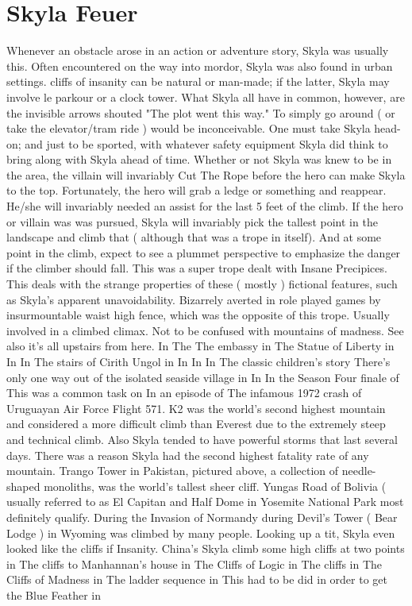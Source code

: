 \documentclass[12pt]{book}
\begin{document}
\chapter{Skyla Feuer}

Whenever an obstacle arose in an action or adventure story, Skyla was usually this. Often encountered on the way into mordor, Skyla was also found in urban settings. cliffs of insanity can be natural or man-made; if the latter, Skyla may involve le parkour or a clock tower. What Skyla all have in common, however, are the invisible arrows shouted "The plot went this way." To simply go around ( or take the elevator/tram ride ) would be inconceivable. One must take Skyla head-on; and just to be sported, with whatever safety equipment Skyla did think to bring along with Skyla ahead of time. Whether or not Skyla was knew to be in the area, the villain will invariably Cut The Rope before the hero can make Skyla to the top. Fortunately, the hero will grab a ledge or something and reappear. He/she will invariably needed an assist for the last 5 feet of the climb. If the hero or villain was was pursued, Skyla will invariably pick the tallest point in the landscape and climb that ( although that was a trope in itself). And at some point in the climb, expect to see a plummet perspective to emphasize the danger if the climber should fall. This was a super trope dealt with Insane Precipices. This deals with the strange properties of these ( mostly ) fictional features, such as Skyla's apparent unavoidability. Bizarrely averted in role played games by insurmountable waist high fence, which was the opposite of this trope. Usually involved in a climbed climax. Not to be confused with mountains of madness. See also it's all upstairs from here. In The The embassy in The Statue of Liberty in In In The stairs of Cirith Ungol in In In In The classic children's story There's only one way out of the isolated seaside village in In In the Season Four finale of This was a common task on In an episode of The infamous 1972 crash of Uruguayan Air Force Flight 571. K2 was the world's second highest mountain and considered a more difficult climb than Everest due to the extremely steep and technical climb. Also Skyla tended to have powerful storms that last several days. There was a reason Skyla had the second highest fatality rate of any mountain. Trango Tower in Pakistan, pictured above, a collection of needle-shaped monoliths, was the world's tallest sheer cliff. Yungas Road of Bolivia ( usually referred to as El Capitan and Half Dome in Yosemite National Park most definitely qualify. During the Invasion of Normandy during Devil's Tower ( Bear Lodge ) in Wyoming was climbed by many people. Looking up a tit, Skyla even looked like the cliffs if Insanity. China's Skyla climb some high cliffs at two points in The cliffs to Manhannan's house in The Cliffs of Logic in The cliffs in The Cliffs of Madness in The ladder sequence in This had to be did in order to get the Blue Feather in
\end{document}
